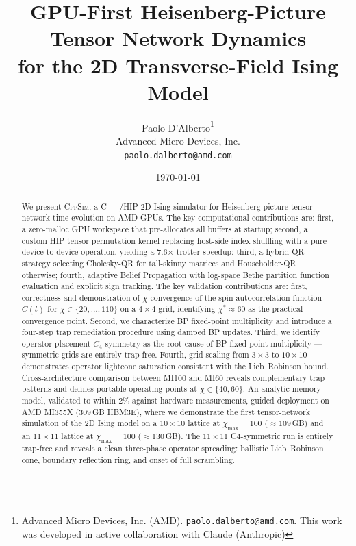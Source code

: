 \documentclass[11pt]{article}
\title{%
  \Large\bfseries GPU-First Heisenberg-Picture Tensor Network Dynamics\\
  for the 2D Transverse-Field Ising Model\\[0.5em]
}
\author{
  Paolo D'Alberto\thanks{Advanced Micro Devices, Inc. (AMD).
  \texttt{paolo.dalberto@amd.com}.
  This work was developed in active collaboration with Claude
  (Anthropic)}\\
  \small Advanced Micro Devices, Inc.\\
  \small\texttt{paolo.dalberto@amd.com}
}
\date{\today}
\newcommand{\chimax}{\chi_{\mathrm{max}}}
\begin{document}
\maketitle
\thispagestyle{fancy}

\begin{abstract}
We present \textsc{CppSim}, a C++/HIP 2D Ising simulator for
Heisenberg-picture tensor network time evolution on AMD GPUs.  The key
computational contributions are: first, a zero-malloc GPU workspace
that pre-allocates all buffers at startup; second, a custom HIP tensor
permutation kernel replacing host-side index shuffling with a pure
device-to-device operation, yielding a 7.6$\times$ trotter speedup;
third, a hybrid QR strategy selecting Cholesky-QR for tall-skinny
matrices and Householder-QR otherwise; fourth, adaptive Belief
Propagation with log-space Bethe partition function evaluation and
explicit sign tracking.  The key validation contributions are: first,
correctness and demonstration of $\chi$-convergence of the spin
autocorrelation function $C(t)$ for $\chi \in \{20,\ldots,110\}$ on a
$4\times4$ grid, identifying $\chi^* \approx 60$ as the practical
convergence point.  Second, we characterize BP fixed-point
multiplicity and introduce a four-step trap remediation procedure
using damped BP updates. Third, we identify operator-placement $C_4$
symmetry as the root cause of BP fixed-point multiplicity ---
symmetric grids are entirely trap-free. Fourth, grid scaling from
$3\times3$ to $10\times10$ demonstrates operator lightcone saturation
consistent with the Lieb--Robinson bound.  Cross-architecture
comparison between MI100 and MI60 reveals complementary trap patterns
and defines portable operating points at $\chi \in \{40, 60\}$.  An
analytic memory model, validated to within 2\% against hardware
measurements, guided deployment on AMD MI355X (309\,GB HBM3E), where we
demonstrate the first tensor-network simulation of the 2D Ising model on
a $10\times10$ lattice at $\chimax=100$ ($\approx109$\,GB) and an
$11\times11$ lattice at $\chimax=100$ ($\approx130$\,GB).  The
$11\times11$ C4-symmetric run is entirely trap-free and reveals a clean
three-phase operator spreading: ballistic Lieb--Robinson cone, boundary
reflection ring, and onset of full scrambling.
\end{abstract}


\end{document}
